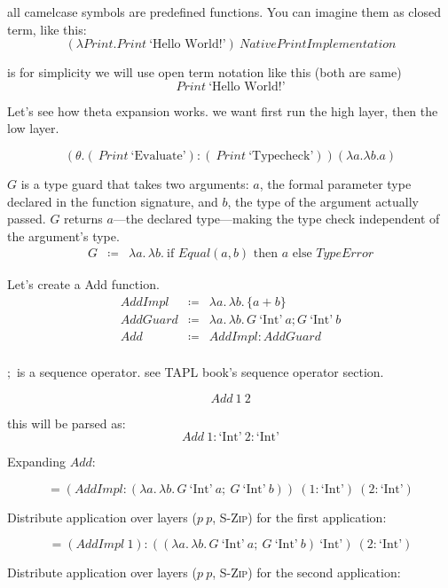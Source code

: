 \documentclass[11pt,letterpaper]{article}
\theoremstyle{definition}
\begin{document}
all camelcase symbols are predefined functions. You can imagine them as closed term, like this:
$$ (\lambda Print. Print\ \text{`Hello World!'})\ NativePrintImplementation $$

is for simplicity we will use open term notation like this (both are same) $$ Print\ \text{`Hello World!'} $$

Let's see how theta expansion works. we want first run the high layer, then the low layer.

$$(\theta.(\ Print\ \text{`Evaluate'}){:}(\ Print\ \text{`Typecheck'})) (\lambda a.\lambda b. a) $$




$G$ is a type guard that takes two arguments: $a$, the formal parameter type declared in the function signature, and $b$, the type of the argument actually passed. $G$ returns $a$---the declared type---making the type check independent of the argument's type.
$$
\begin{array}{rcl}
G &\coloneqq& \lambda a.\,\lambda b.\
  \text{if } Equal(a, b) \text{ then } a \text{ else } \mathit{TypeError}
\end{array}
$$


Let's create a  Add function.
$$
\begin{array}{rcl}
  AddImpl &\coloneqq& \lambda a.\,\lambda b.\, \{a + b\} \\[4pt]
AddGuard &\coloneqq& \lambda a.\,\lambda b.\, {G\ \text{`Int'}\ a; G\ \text{`Int'}\ b} \\[4pt]
Add &\coloneqq& AddImpl{:} AddGuard \\[4pt]
\end{array}
$$


$;$ is a sequence operator. see TAPL book's sequence operator section.



$$
Add\ 1\ 2
$$

this will be parsed as:
$$ Add\ 1{:}\text{`Int'}\ 2{:}\text{`Int'} $$

Expanding $Add$:

$$
= (AddImpl{:}(\lambda a.\,\lambda b.\, G\ \text{`Int'}\ a;\ G\ \text{`Int'}\ b))
  \ (1{:}\text{`Int'})\ (2{:}\text{`Int'})
$$


Distribute application over layers ($p\ p$, \textsc{S-Zip}) for the first application:

$$
= (AddImpl\ 1){:}((\lambda a.\,\lambda b.\, G\ \text{`Int'}\ a;\ G\ \text{`Int'}\ b)\ \text{`Int'})
  \ (2{:}\text{`Int'})
$$

Distribute application over layers ($p\ p$, \textsc{S-Zip}) for the second application:
\end{document}
